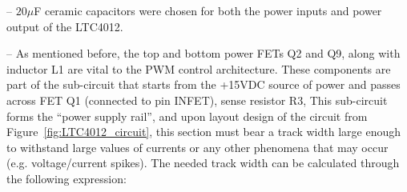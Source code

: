 -- $20 \mu$F ceramic capacitors were chosen for both the power inputs and power output of the LTC4012. 

-- As mentioned before, the top and bottom power FETs Q2 and Q9, along with inductor L1 are vital to the PWM control architecture. These components are part of the sub-circuit that starts from the +15VDC source of power and passes across FET Q1 (connected to pin INFET), sense resistor R3, 
This sub-circuit forms the ``power supply rail'', and upon layout design of the circuit from Figure~\ref{fig:LTC4012_circuit}, this section must bear a track width large enough to withstand large values of currents or any other phenomena that may occur (e.g. voltage/current spikes). The needed track width can be calculated through the following expression: